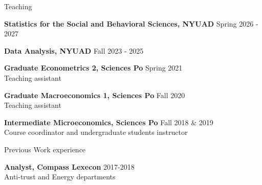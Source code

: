 \documentclass{resume} %
\begin{document}

\begin{rSection}{Teaching}

{\bf Statistics for the Social and Behavioral Sciences, NYUAD} \hfill {Spring 2026 - 2027}
  
{\bf Data Analysis, NYUAD} \hfill {Fall 2023 - 2025}

{\bf Graduate Econometrics 2, Sciences Po} \hfill {Spring 2021}
  \\ Teaching assistant

{\bf Graduate Macroeconomics 1, Sciences Po} \hfill {Fall 2020}
  \\ Teaching assistant


{\bf Intermediate Microeconomics, Sciences Po} \hfill {Fall 2018 \& 2019}
\\ Course coordinator and undergraduate students instructor

\end{rSection}


\begin{rSection}{Previous Work experience}


{\bf Analyst, Compass Lexecon} \hfill {2017-2018}
\\ Anti-trust and Energy departments


\end{rSection}

\end{document}
